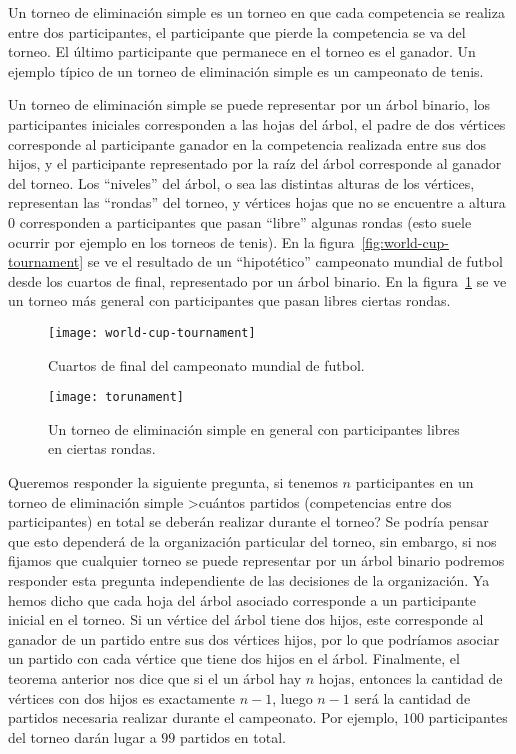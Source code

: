 \begin{ejemplo}
  Un torneo de eliminación simple es un torneo en que cada competencia se realiza entre dos participantes, el participante que pierde la competencia se va del torneo.
  El último participante que permanece en el torneo es el ganador.
  Un ejemplo típico de un torneo de eliminación simple es un campeonato de tenis.
  
  Un torneo de eliminación simple se puede representar por un árbol binario, los participantes iniciales corresponden a las hojas del árbol, el padre de dos vértices corresponde al participante ganador en la competencia realizada entre sus dos hijos, y el participante representado por la raíz del árbol corresponde al ganador del torneo.
   Los ``niveles'' del árbol, o sea las distintas alturas de los vértices, representan las ``rondas'' del torneo, y vértices hojas que no se encuentre a altura $0$ corresponden a participantes que pasan ``libre'' algunas rondas (esto suele ocurrir por ejemplo en los torneos de tenis).
   En la figura~\ref{fig:world-cup-tournament} se ve el resultado de un ``hipotético'' campeonato mundial de futbol desde los cuartos de final, representado por un árbol binario.
   En la figura~\ref{fig:tournament} se ve un torneo más general con participantes que pasan libres ciertas rondas.
   
   \begin{figure}[t!]
   \centering
   \vspace*{200pt}
   \texttt{[image: world-cup-tournament]}
   \caption{Cuartos de final del campeonato mundial de futbol.}
   \label{fig:world-cup-tournament}
   \centering
   \vspace*{200pt}
   \texttt{[image: torunament]}
   \caption{Un torneo de eliminación simple en general con participantes libres en ciertas rondas.}
   \label{fig:tournament}
   \end{figure}
   
   Queremos responder la siguiente pregunta, si tenemos $n$ participantes en un torneo de eliminación simple >cuántos partidos (competencias entre dos participantes) en total se deberán realizar durante el torneo?
   Se podría pensar que esto dependerá de la organización particular del torneo, sin embargo, si nos fijamos que cualquier torneo se puede representar por un árbol binario podremos responder esta pregunta independiente de las decisiones de la organización.
   Ya hemos dicho que cada hoja del árbol asociado corresponde a un participante inicial en el torneo.
   Si un vértice del árbol tiene dos hijos, este corresponde al ganador de un partido entre sus dos vértices hijos, por lo que podríamos asociar un partido con cada vértice que tiene dos hijos en el árbol.
   Finalmente, el teorema anterior nos dice que si el un árbol hay $n$ hojas, entonces la cantidad de vértices con dos hijos es exactamente $n-1$, luego $n-1$ será la cantidad de partidos necesaria realizar durante el campeonato.
   Por ejemplo, $100$ participantes del torneo darán lugar a $99$ partidos en total.
\end{ejemplo}

